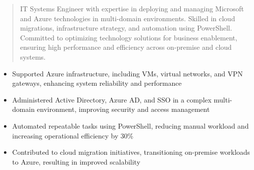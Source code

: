 



\makecvheader

\begin{quote}
  \noindent
  IT Systems Engineer with expertise in deploying and managing Microsoft and Azure technologies in multi-domain environments. Skilled in cloud migrations, infrastructure strategy, and automation using PowerShell. Committed to optimizing technology solutions for business enablement, ensuring high performance and efficiency across on-premise and cloud systems.
\end{quote}

\par\smallskip
\noindent
\begin{minipage}{20cm}
  \begin{minipage}{9.75cm}
    \begin{itemize}
      \item Supported Azure infrastructure, including VMs, virtual networks, and VPN gateways, enhancing system reliability and performance
      \item Administered Active Directory, Azure AD, and SSO in a complex multi-domain environment, improving security and access management
    \end{itemize}
  \end{minipage}
  \hfill
  \begin{minipage}{9.75cm}
    \begin{itemize}
      \item Automated repeatable tasks using PowerShell, reducing manual workload and increasing operational efficiency by 30\%
      \item Contributed to cloud migration initiatives, transitioning on-premise workloads to Azure, resulting in improved scalability
    \end{itemize}
  \end{minipage}
\end{minipage}
\par\smallskip
\divider

